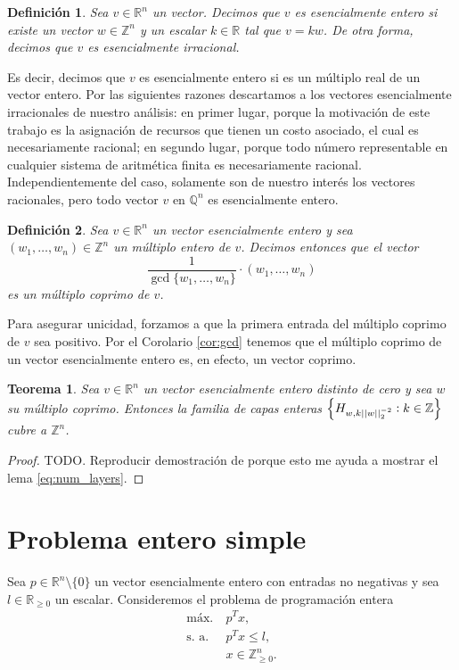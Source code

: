 \documentclass[11pt]{article}
\newtheorem{definition}{Definición}
\newtheorem{theorem}{Teorema}
\begin{document}
\begin{definition}
	Sea $v \in \mathbb{R}^n$ un vector. Decimos que $v$ es esencialmente entero si existe un vector
	$w \in \mathbb{Z}^n$ y un escalar $k \in \mathbb{R}$ tal que $v = kw$. De otra forma, decimos
	que $v$ es esencialmente irracional.
\end{definition}

Es decir, decimos que $v$ es esencialmente entero si es un múltiplo real de un vector entero. Por
las siguientes razones descartamos a los vectores esencialmente irracionales de nuestro análisis: en
primer lugar, porque la motivación de este trabajo es la asignación de recursos que tienen un costo
asociado, el cual es necesariamente racional; en segundo lugar, porque todo número representable en
cualquier sistema de aritmética finita es necesariamente racional. Independientemente del caso,
solamente son de nuestro interés los vectores racionales, pero todo vector $v$ en $\mathbb{Q}^n$ es
esencialmente entero.

\begin{definition}
	Sea $v \in \mathbb{R}^n$ un vector esencialmente entero y sea $(w_1, \ldots, w_n) \in
	\mathbb{Z}^n$ un múltiplo entero de $v$. Decimos entonces que el vector
	\begin{equation*}
		\frac{1}{\gcd\lbrace w_1, \ldots, w_n\rbrace} \cdot (w_1, \ldots, w_n)
	\end{equation*}
	es un múltiplo coprimo de $v$.
\end{definition}

Para asegurar unicidad, forzamos a que la primera entrada del múltiplo coprimo de $v$ sea positivo.
Por el Corolario \ref{cor:gcd} tenemos que el múltiplo coprimo de un vector esencialmente entero
es, en efecto, un vector coprimo.

\begin{theorem}
	Sea $v \in \mathbb{R}^n$ un vector esencialmente entero distinto de cero y sea $w$ su múltiplo
	coprimo. Entonces la familia de capas enteras $\left\lbrace H_{w, k||w||_2^{-2}} \vcentcolon k
	\in \mathbb{Z} \right\rbrace$ cubre a $\mathbb{Z}^n$.
\end{theorem}
\begin{proof}
	TODO. Reproducir demostración de \cite{sip} porque esto me ayuda a mostrar el lema
	\ref{eq:num_layers}.
\end{proof}

\section*{Problema entero simple}
Sea $p \in \mathbb{R}^n \setminus\lbrace 0 \rbrace$ un vector esencialmente entero con entradas no
negativas y sea $l \in \mathbb{R}_{\geq 0}$ un escalar. Consideremos el problema de programación
entera
\begin{align}
	\text{máx.} ~& p^Tx, \label{eq:simple:obj} \\
	\text{s. a.} ~& p^Tx \leq l, \label{eq:simple:boundary} \\
				  & x \in \mathbb{Z}_{\geq 0}^n. \nonumber
\end{align}
\end{document}
